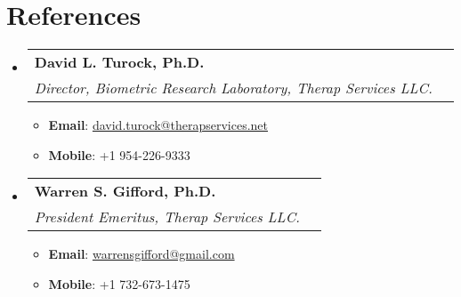\documentclass[letterpaper,11pt]{article}
\makeatletter
\newcommand{\resumeItem}[2]{
  \item\small{
    \textbf{#1}{: #2 \vspace{-2pt}}
  }
}
\newcommand{\resumeSubheading}[4]{
  \vspace{-1pt}\item
    \begin{tabular*}{0.97\textwidth}[t]{l@{\extracolsep{\fill}}r}
      \textbf{#1} & #2 \\
      \textit{\small#3} & \textit{\small #4} \\
    \end{tabular*}\vspace{-5pt}
}
\newcommand{\resumeSubHeadingListStart}{\begin{itemize}[leftmargin=*]}
\newcommand{\resumeSubHeadingListEnd}{\end{itemize}}
\newcommand{\resumeItemListStart}{\begin{itemize}}
\newcommand{\resumeItemListEnd}{\end{itemize}\vspace{-5pt}}
\makeatother
\begin{document}
\section{References}
  \resumeSubHeadingListStart
       \resumeSubheading
      {David L. Turock, Ph.D.}{}
      {Director, Biometric Research Laboratory, Therap Services LLC.}{}
      \resumeItemListStart
      	\resumeItem{Email}{ \href{mailto:david.turock@therapservices.net}{david.turock@therapservices.net}}
      	\resumeItem{Mobile}{+1 954-226-9333}
      \resumeItemListEnd
       \resumeSubheading
      {Warren S. Gifford, Ph.D.}{}
      {President Emeritus, Therap Services LLC.}{}
      \resumeItemListStart
      	\resumeItem{Email}{ \href{mailto:warrensgifford@gmail.com}{warrensgifford@gmail.com}}
      	\resumeItem{Mobile}{+1 732-673-1475}
      \resumeItemListEnd    
 \resumeSubHeadingListEnd
\end{document}
